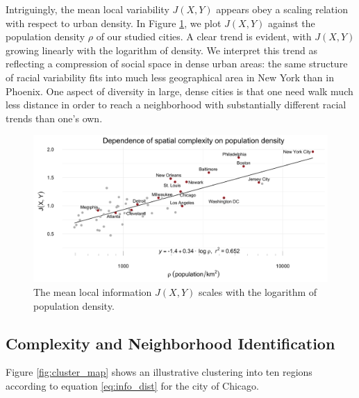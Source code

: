 	Intriguingly, the mean local variability $J(X,Y)$ appears obey a scaling relation with respect to urban density. In Figure \ref{fig:density}, we plot $J(X,Y)$ against the population density $\rho$ of our studied cities. A clear trend is evident, with $J(X,Y)$ growing linearly with the logarithm of density. We interpret this trend as reflecting a compression of social space in dense urban areas: the same structure of racial variability fits into much less geographical area in New York than in Phoenix. One aspect of diversity in large, dense cities is that one need walk much less distance in order to reach a neighborhood with substantially different racial trends than one's own. 
	 
		\begin{figure}
			\includegraphics[width=1\textwidth]{figs/density_fisher.png}
			\caption{The mean local information $J(X,Y)$ scales with the logarithm of population density.}
			\label{fig:density}
		\end{figure}	

\subsection{Complexity and Neighborhood Identification}


	Figure \ref{fig:cluster_map} shows an illustrative clustering into ten regions according to equation \eqref{eq:info_dist} for the city of Chicago. 
	
